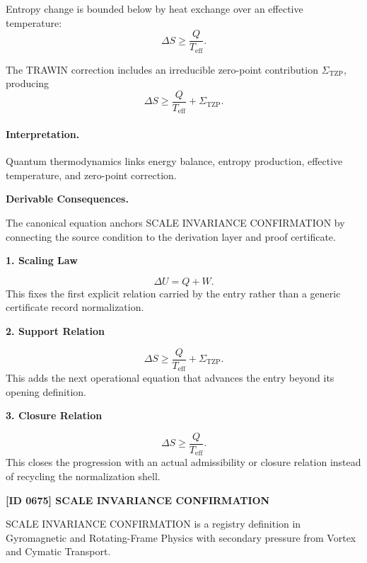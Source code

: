 Entropy change is bounded below by heat exchange over an effective temperature:
\begin{equation}
\Delta S\geq \frac{Q}{T_{\mathrm{eff}}}.
\end{equation}

The TRAWIN correction includes an irreducible zero-point contribution $\Sigma_{\mathrm{TZP}}$, producing
\begin{equation}
\boxed{
\Delta S
\geq
\frac{Q}{T_{\mathrm{eff}}}
+
\Sigma_{\mathrm{TZP}} .
}
\end{equation}

\paragraph{Interpretation.}
Quantum thermodynamics links energy balance, entropy production, effective temperature, and zero-point correction.

\par\vspace{0.35em}
\noindent\textbf{Derivable Consequences.}\quad
\begingroup
\footnotesize
\raggedright
The canonical equation anchors SCALE INVARIANCE CONFIRMATION by connecting the source condition to the derivation layer and proof certificate.
\par\endgroup

\noindent\textbf{1. Scaling Law}\par
\[
\Delta U = Q+W.
\]
\noindent This fixes the first explicit relation carried by the entry rather than a generic certificate record normalization.\par
\noindent\textbf{2. Support Relation}\par
\[
\Delta S \geq \frac{Q}{T_{\mathrm{eff}}} + \Sigma_{\mathrm{TZP}}.
\]
\noindent This adds the next operational equation that advances the entry beyond its opening definition.\par
\noindent\textbf{3. Closure Relation}\par
\[
\Delta S\geq \frac{Q}{T_{\mathrm{eff}}}.
\]
\noindent This closes the progression with an actual admissibility or closure relation instead of recycling the normalization shell.\par

\clearpage
\noindent\textbf{[ID 0675] SCALE INVARIANCE CONFIRMATION}\par
\vspace{0.35em}
\begingroup\small
{}
SCALE INVARIANCE CONFIRMATION is a registry definition in Gyromagnetic and Rotating-Frame Physics with secondary pressure from Vortex and Cymatic Transport.

